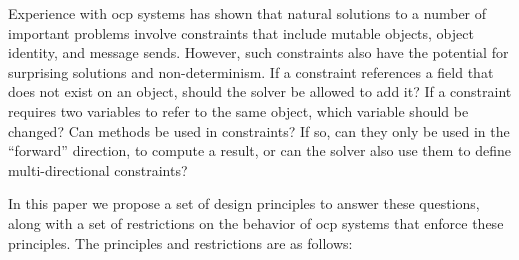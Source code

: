 \documentclass[10pt,reprint]{sigplanconf-preprint}
\newcommand{\ac}[1]{\gls*{#1}}
\begin{document}
Experience with \ac{ocp} systems has shown that natural solutions to a number of
important problems involve constraints that include mutable objects,
object identity, and message sends.  However, such constraints also have the potential for
surprising solutions and non-determinism. If a constraint references a
field that does not exist on an object, should the solver be allowed
to add it? If a constraint requires two variables to refer to the same
object, which variable should be changed? Can methods be used in
constraints?  If so, can they only be used in the ``forward''
direction, to compute a result, or can the solver also use them to define
multi-directional constraints?

In this paper we propose a set of design principles to answer these
questions, along with a set of restrictions on the behavior of
\ac{ocp} systems that enforce these principles.  The principles and
restrictions are as follows:
\end{document}
